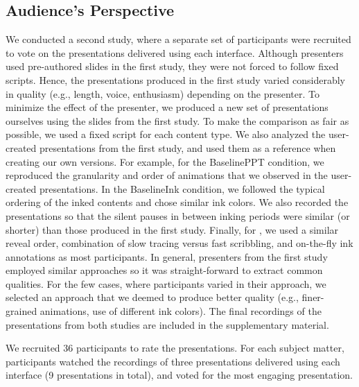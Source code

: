 \subsection{Audience's Perspective}
We conducted a second study, where a separate set of participants were recruited to vote on the presentations delivered using each interface. Although presenters used pre-authored slides in the first study, they were not forced to follow fixed scripts. Hence, the presentations produced in the first study varied considerably in quality (e.g., length, voice, enthusiasm) depending on the presenter. To minimize the effect of the presenter, we 
produced a new set of presentations ourselves using the slides from the first study.
%
To make the comparison as fair as possible, we used a fixed script for each content type.
We also analyzed the user-created presentations from the first study, and used them as a reference when creating our own versions. 
%
For example, for the BaselinePPT condition, we reproduced the granularity and order of animations that we observed in the user-created presentations.
In the BaselineInk condition, we followed the typical ordering of the inked contents and chose similar ink colors. We also recorded the presentations so that the silent pauses in between inking periods were similar (or shorter) than those produced in the first study. 
%
Finally, for \interface, we used a similar reveal order, combination of slow tracing versus fast scribbling, and on-the-fly ink annotations as most participants. 
%
In general, presenters from the first study employed similar approaches so it was straight-forward to extract common qualities. For the few cases, where participants varied in their approach, we selected an approach that we deemed to produce better quality (e.g., finer-grained animations, use of different ink colors). The final recordings of the presentations from both studies are included in the supplementary material. 

We recruited 36 participants to rate the presentations. For each subject matter, participants watched the recordings of three presentations delivered using each interface (9 presentations in total), and voted for the most engaging presentation. 














